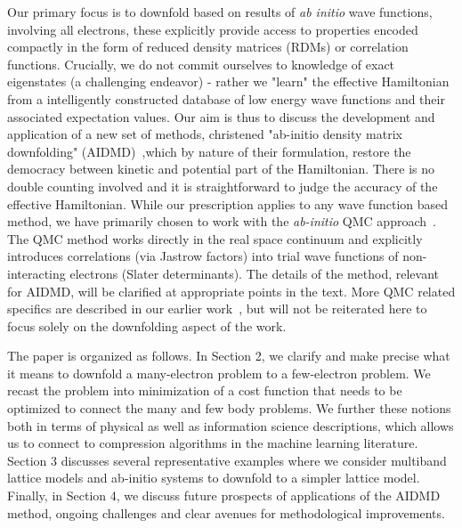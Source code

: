 Our primary focus is to downfold based on results of \textit{ab initio} wave functions, involving all electrons, these explicitly provide access to properties encoded compactly in the form of reduced density matrices (RDMs) or correlation functions. 
Crucially, we do not commit ourselves to knowledge of exact eigenstates (a challenging endeavor) - rather we "learn" the effective Hamiltonian from a intelligently constructed database of low energy wave functions and their associated expectation values. 
Our aim is thus to discuss the development and application of a new set of methods, christened "ab-initio density matrix downfolding" (AIDMD)~\cite{Changlani2015},which by nature of their formulation, restore the democracy between kinetic and potential part of the Hamiltonian. 
There is no double counting involved and it is straightforward to judge the accuracy of the effective Hamiltonian. 
While our prescription applies to any wave function based method, we have primarily chosen to work with the \textit{ab-initio} QMC approach~\cite{Ceperley_Alder,Foulkes_review}. 
The QMC method works directly in the real space continuum and explicitly introduces correlations (via Jastrow factors) into trial wave functions of non-interacting electrons (Slater determinants). 
The details of the method, relevant for AIDMD, will be clarified at appropriate points in the text. 
More QMC related specifics are described in our earlier work~\cite{Changlani2015,}, but will not be reiterated here to focus solely on the downfolding aspect of the work. 


The paper is organized as follows. In Section 2, we clarify and make precise what it means to downfold 
a many-electron problem to a few-electron problem. We recast the problem into minimization 
of a cost function that needs to be optimized to connect the many and few body problems. We further 
these notions both in terms of physical as well as information science descriptions, which allows us to connect to 
compression algorithms in the machine learning literature. 
Section 3 discusses several representative examples where we consider multiband lattice models 
and ab-initio systems to downfold to a simpler lattice model. 
Finally, in Section 4, we discuss future prospects of applications of the AIDMD method, ongoing challenges 
and clear avenues for methodological improvements. 


